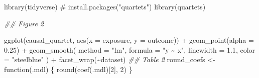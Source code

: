 \documentclass[
  letterpaper,
  DIV=11,
  numbers=noendperiod]{scrartcl}
\newenvironment{Shaded}{\begin{snugshade}}{\end{snugshade}}
\newcommand{\AttributeTok}[1]{\textcolor[rgb]{0.40,0.45,0.13}{#1}}
\newcommand{\CommentTok}[1]{\textcolor[rgb]{0.37,0.37,0.37}{#1}}
\newcommand{\ControlFlowTok}[1]{\textcolor[rgb]{0.00,0.23,0.31}{#1}}
\newcommand{\DecValTok}[1]{\textcolor[rgb]{0.68,0.00,0.00}{#1}}
\newcommand{\DocumentationTok}[1]{\textcolor[rgb]{0.37,0.37,0.37}{\textit{#1}}}
\newcommand{\FloatTok}[1]{\textcolor[rgb]{0.68,0.00,0.00}{#1}}
\newcommand{\FunctionTok}[1]{\textcolor[rgb]{0.28,0.35,0.67}{#1}}
\newcommand{\NormalTok}[1]{\textcolor[rgb]{0.00,0.23,0.31}{#1}}
\newcommand{\OtherTok}[1]{\textcolor[rgb]{0.00,0.23,0.31}{#1}}
\newcommand{\SpecialCharTok}[1]{\textcolor[rgb]{0.37,0.37,0.37}{#1}}
\newcommand{\StringTok}[1]{\textcolor[rgb]{0.13,0.47,0.30}{#1}}
\begin{document}
\begin{Shaded}
\begin{Highlighting}[]
\FunctionTok{library}\NormalTok{(tidyverse)}
\CommentTok{\# install.packages("quartets")}
\FunctionTok{library}\NormalTok{(quartets)}

\DocumentationTok{\#\# Figure 2}

\FunctionTok{ggplot}\NormalTok{(causal\_quartet, }\FunctionTok{aes}\NormalTok{(}\AttributeTok{x =}\NormalTok{ exposure, }\AttributeTok{y =}\NormalTok{ outcome)) }\SpecialCharTok{+}
  \FunctionTok{geom\_point}\NormalTok{(}\AttributeTok{alpha =} \FloatTok{0.25}\NormalTok{) }\SpecialCharTok{+}
  \FunctionTok{geom\_smooth}\NormalTok{(}
    \AttributeTok{method =} \StringTok{"lm"}\NormalTok{,}
    \AttributeTok{formula =} \StringTok{"y \textasciitilde{} x"}\NormalTok{,}
    \AttributeTok{linewidth =} \FloatTok{1.1}\NormalTok{,}
    \AttributeTok{color =} \StringTok{"steelblue"}
\NormalTok{  ) }\SpecialCharTok{+}
  \FunctionTok{facet\_wrap}\NormalTok{(}\SpecialCharTok{\textasciitilde{}}\NormalTok{dataset)}
\DocumentationTok{\#\# Table 2}
\NormalTok{round\_coefs }\OtherTok{\textless{}{-}} \ControlFlowTok{function}\NormalTok{(.mdl) \{}
  \FunctionTok{round}\NormalTok{(}\FunctionTok{coef}\NormalTok{(.mdl)[}\DecValTok{2}\NormalTok{], }\DecValTok{2}\NormalTok{)}
\NormalTok{\}}


\end{Highlighting}
\end{Shaded}
\end{document}
